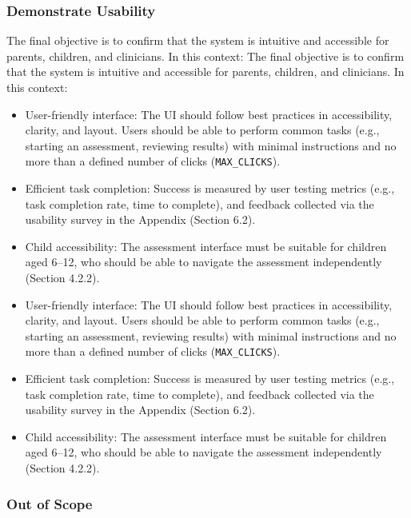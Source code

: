 \documentclass[12pt, titlepage]{article}
\begin{document}
\subsubsection{Demonstrate Usability}
The final objective is to confirm that the system is intuitive and accessible for parents, children, and clinicians. In this context:
The final objective is to confirm that the system is intuitive and accessible for parents, children, and clinicians. In this context:
\begin{itemize}
  \item User-friendly interface: The UI should follow best practices in accessibility, clarity, and layout. Users should be able to perform common tasks (e.g., starting an assessment, reviewing results) with minimal instructions and no more than a defined number of clicks (\texttt{MAX\_CLICKS}).
  \item Efficient task completion: Success is measured by user testing metrics (e.g., task completion rate, time to complete), and feedback collected via the usability survey in the Appendix (Section 6.2).
  \item Child accessibility: The assessment interface must be suitable for children aged 6–12, who should be able to navigate the assessment independently (Section 4.2.2).
  \item User-friendly interface: The UI should follow best practices in accessibility, clarity, and layout. Users should be able to perform common tasks (e.g., starting an assessment, reviewing results) with minimal instructions and no more than a defined number of clicks (\texttt{MAX\_CLICKS}).
  \item Efficient task completion: Success is measured by user testing metrics (e.g., task completion rate, time to complete), and feedback collected via the usability survey in the Appendix (Section 6.2).
  \item Child accessibility: The assessment interface must be suitable for children aged 6–12, who should be able to navigate the assessment independently (Section 4.2.2).
\end{itemize}

\subsubsection*{Out of Scope}
\end{document}
